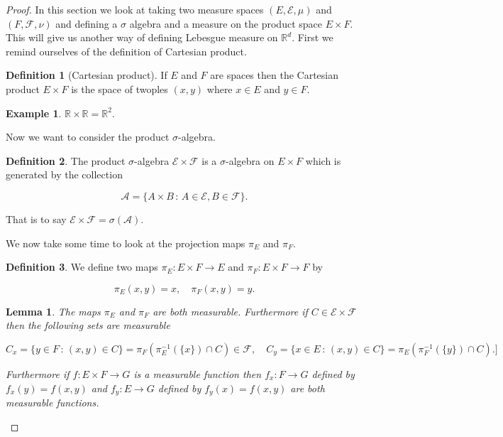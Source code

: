 \documentclass[
]{book}
\newtheorem{lemma}{Lemma}[chapter]
\theoremstyle{definition}
\newtheorem{definition}{Definition}[chapter]
\theoremstyle{definition}
\newtheorem{example}{Example}[chapter]
\theoremstyle{definition}
\theoremstyle{definition}
\theoremstyle{remark}
\begin{document}
\begin{proof}
In this section we look at taking two measure spaces \((E, \mathcal{E}, \mu)\) and \((F, \mathcal{F}, \nu)\) and defining a \(\sigma\) algebra and a measure on the product space \(E \times F\). This will give us another way of defining Lebesgue measure on \(\mathbb{R}^d\). First we remind ourselves of the definition of Cartesian product.

\begin{definition}[Cartesian product]
If \(E\) and \(F\) are spaces then the Cartesian product \(E \times F\) is the space of twoples \((x,y)\) where \(x \in E\) and \(y \in F\).
\end{definition}

\begin{example}
\(\mathbb{R} \times \mathbb{R} = \mathbb{R}^2\).
\end{example}

Now we want to consider the product \(\sigma\)-algebra.

\begin{definition}
The product \(\sigma\)-algebra \(\mathcal{E} \times \mathcal{F}\) is a \(\sigma\)-algebra on \(E \times F\) which is generated by the collection

\[ \mathcal{A} = \{ A \times B \,:\, A \in \mathcal{E}, B \in \mathcal{F}\}. \]

That is to say \(\mathcal{E} \times \mathcal{F} = \sigma(\mathcal{A}).\)
\end{definition}

We now take some time to look at the projection maps \(\pi_E\) and \(\pi_F\).

\begin{definition}
We define two maps \(\pi_E: E \times F \rightarrow E\) and \(\pi_F: E \times F \rightarrow F\) by

\[ \pi_E (x,y) = x, \quad \pi_F(x,y) = y. \]
\end{definition}

\begin{lemma}
The maps \(\pi_E\) and \(\pi_F\) are both measurable. Furthermore if \(C \in \mathcal{E} \times \mathcal{F}\) then the following sets are measurable

\[ C_x = \{ y \in F \,:\, (x,y) \in C \} = \pi_F\left(\pi_E^{-1}(\{x\}) \cap C\right) \in \mathcal{F} , \quad C_y = \{ x \in E \,:\, (x,y) \in C\} = \pi_E \left( \pi_F^{-1}(\{y\}) \cap C \right). ] \]

Furthermore if \(f: E \times F \rightarrow G\) is a measurable function then \(f_x: F \rightarrow G\) defined by \(f_x(y) = f(x,y)\) and \(f_y: E \rightarrow G\) defined by \(f_y(x) = f(x,y)\) are both measurable functions.
\end{lemma}


\end{proof}
\end{document}

